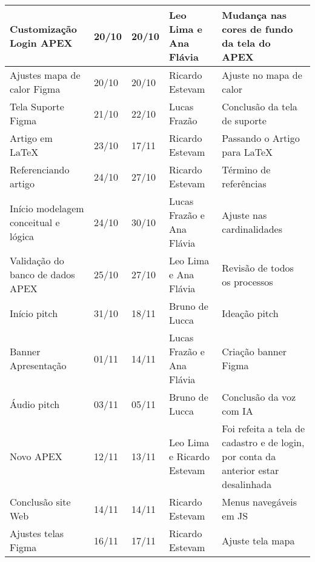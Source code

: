 \documentclass[
landscape,
  a4paper,%
  12pt,%
  english,%
  brazilian,%
]{article}
\begin{document}
\begin{table}[]
{\begin{tabular}{|l|l|l|l|l|}
Customização Login APEX             & 20/10 & 20/10 & Leo Lima e Ana Flávia & Mudança nas cores de fundo da tela do APEX \\ \hline
Ajustes mapa de calor Figma         & 20/10 & 20/10 & Ricardo Estevam & Ajuste no mapa de calor \\ \hline
Tela Suporte Figma                  & 21/10 & 22/10 & Lucas Frazão & Conclusão da tela de suporte \\ \hline
Artigo em LaTeX                     & 23/10 & 17/11 & Ricardo Estevam & Passando o Artigo para LaTeX \\ \hline
Referenciando artigo                & 24/10 & 27/10 & Ricardo Estevam & Término de referências \\ \hline
Início modelagem conceitual e lógica& 24/10 & 30/10 & Lucas Frazão e Ana Flávia & Ajuste nas cardinalidades \\ \hline
Validação do banco de dados APEX    & 25/10 & 27/10 & Leo Lima e Ana Flávia & Revisão de todos os processos \\ \hline
Início pitch                        & 31/10 & 18/11 & Bruno de Lucca & Ideação pitch \\ \hline
Banner Apresentação                 & 01/11 & 14/11 & Lucas Frazão e Ana Flávia & Criação banner Figma \\ \hline
Áudio pitch                         & 03/11 & 05/11 & Bruno de Lucca & Conclusão da voz com IA \\ \hline
Novo APEX                           & 12/11 & 13/11 & Leo Lima e Ricardo Estevam & Foi refeita a tela de cadastro e de login, por conta da anterior estar desalinhada \\ \hline
Conclusão site Web                  & 14/11 & 14/11 & Ricardo Estevam & Menus navegáveis em JS \\ \hline
Ajustes telas Figma                 & 16/11 & 17/11 & Ricardo Estevam & Ajuste tela mapa\\ \hline
\end{tabular}
}
\end{table}
\end{document}

